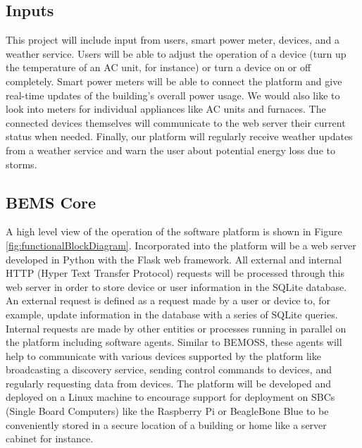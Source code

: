 \documentclass[letterpaper,12pt]{article}   %
\begin{document}
\subsection{Inputs}
This project will include input from users, smart power meter, devices, and a weather service. Users will be able to adjust the operation of a device (turn up the temperature of an AC unit, for instance) or turn a device on or off completely. Smart power meters will be able to connect the platform and give real-time updates of the building's overall power usage. We would also like to look into meters for individual appliances like AC units and furnaces. The connected devices themselves will communicate to the web server their current status when needed. Finally, our platform will regularly receive weather updates from a weather service and warn the user about potential energy loss due to storms.

\subsection{BEMS Core}
A high level view of the operation of the software platform is shown in Figure \ref{fig:functionalBlockDiagram}. Incorporated into the platform will be a web server developed in Python with the Flask web framework. All external and internal HTTP (Hyper Text Transfer Protocol) requests will be processed through this web server in order to store device or user information in the SQLite database. An external request is defined as a request made by a user or device to, for example, update information in the database with a series of SQLite queries. Internal requests are made by other entities or processes running in parallel on the platform including software agents. Similar to BEMOSS, these agents will help to communicate with various devices supported by the platform like broadcasting a discovery service, sending control commands to devices, and regularly requesting data from devices. The platform will be developed and deployed on a Linux machine to encourage support for deployment on SBCs (Single Board Computers) like the Raspberry Pi or BeagleBone Blue to be conveniently stored in a secure location of a building or home like a server cabinet for instance.
\end{document}
